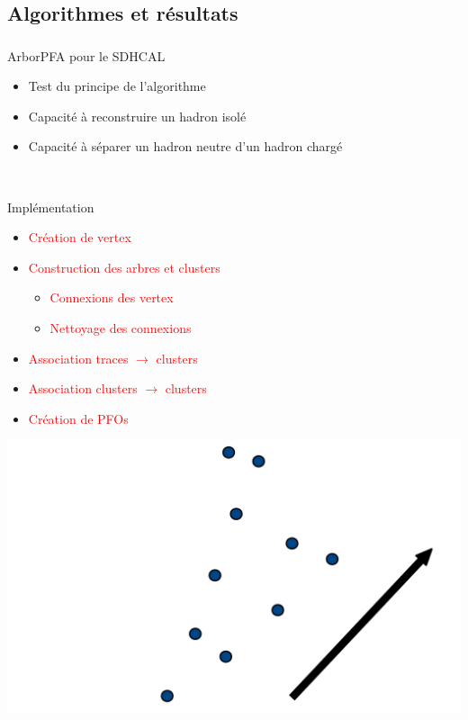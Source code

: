 \documentclass[8pt]{beamer}
\begin{document}
  \subsection{Algorithmes et résultats}

  \begin{frame}
  \frametitle{\secname}
  \framesubtitle{\subsecname}
    \begin{block}{ArborPFA pour le SDHCAL}
      \begin{itemize}
        \item Test du principe de l'algorithme
        \item Capacité à reconstruire un hadron isolé
        \item Capacité à séparer un hadron neutre d'un hadron chargé
      \end{itemize}
    \end{block}
    ~ \\
    \pause
    \begin{minipage}{0.6\linewidth}
      \begin{block}{Implémentation}
        \begin{itemize}
          \item \textcolor<2>{red}{Création de vertex }
          \item \textcolor<3,7>{red}{Construction des arbres et clusters }
          \begin{itemize}
            \item \textcolor<3,7>{red}{Connexions des vertex}
            \item \textcolor<3,7>{red}{Nettoyage des connexions}
          \end{itemize}
          \item \textcolor<4>{red}{Association traces $\rightarrow$ clusters}
          \item \textcolor<5>{red}{Association clusters $\rightarrow$ clusters}
          \item \textcolor<6>{red}{Création de PFOs}
        \end{itemize}
      \end{block}
    \end{minipage}
    \begin{minipage}{0.39\linewidth}
      \begin{overprint}
         \centering \includegraphics[width=0.8\linewidth]{VertexCreationIntro.pdf}

\end{overprint}
\end{minipage}
\end{frame}
\end{document}

